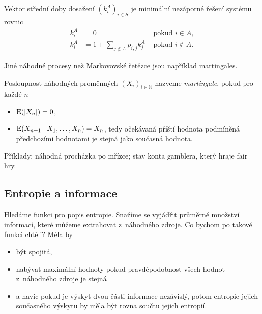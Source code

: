 {\begin{example}
\end{example}

\begin{theorem}
    Vektor střední doby dosažení $(k^A_i)_{i \in S}$
    je minimální nezáporné řešení systému rovnic
    \begin{align*}
        k^A_i &= 0 &\text{ pokud } i \in A, \\
        k^A_i &= 1 + \sum_{j \not \in A} p_{i,j} k^A_j &\text{ pokud } i \not \in A.
    \end{align*}
\end{theorem}

\begin{example}
\end{example}

Jiné náhodné procesy než Markovovské řetězce jsou například martingales.

\begin{definition}
    Posloupnost náhodných proměnných $(X_i)_{i \in \mathbb{N}}$ nazveme
    {\em martingale}, pokud pro každé $n$
    \begin{itemize}
        \item $\operatorname{E}(\lvert X_n \rvert) = 0$,
        \item $\operatorname{E}(X_{n+1} \mid X_1, \ldots, X_n) = X_n$,
            tedy očekávaná příští hodnota podmíněná předchozími
            hodnotami je stejná jako současná hodnota.
    \end{itemize}
\end{definition}

Příklady: náhodná procházka po mřízce; stav konta gamblera, který hraje
fair hry.

\subsection{Entropie a informace}

Hledáme funkci pro popis entropie.
Snažíme se vyjádřit průměrné množství informací, které můžeme extrahovat
z~náhodného zdroje. Co bychom po takové funkci chtěli? Měla by
\begin{itemize}
    \item být spojitá,
    \item nabývat maximální hodnoty pokud pravděpodobnost všech hodnot
z~náhodného zdroje je stejná
    \item a navíc pokud je výskyt dvou části informace
nezávislý, potom entropie jejich současného výskytu by měla být rovna
součtu jejich entropií.
\end{itemize}

}
